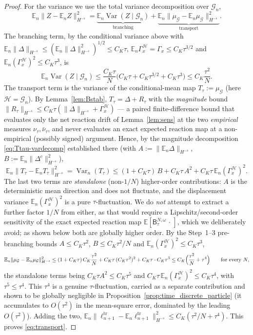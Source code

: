 \documentclass[a4paper,fleqn]{cas-sc}
\theoremstyle{definition}
\theoremstyle{remark}
\begin{document}
\begin{proof}
For the variance we use the total variance decomposition over $\mathcal G_n$,
\[
\mathbb E_n\|Z-\mathbb E_nZ\|_{H^{-s}}^2
=\underbrace{\mathbb E_n\operatorname{Var}(Z\mid\mathcal G_n)}_{\text{branching}}
+\underbrace{\mathbb E_n\|\mu_{\mathcal G}-\mathbb E_n\mu_{\mathcal G}\|_{H^{-s}}^2}_{\text{transport}}.
\]
The branching term, by the conditional variance above with
$\mathbb E_n\|\Delta\|_{H^{-s}}\le(\mathbb E_n\|\Delta\|_{H^{-s}}^2)^{1/2}\le C_K\tau$,
$\mathbb E_n\Gamma_x^{\mathcal H}=\Gamma_x\le C_K\tau^{3/2}$ and
$\mathbb E_n(\Gamma_x^{\mathcal H})^2\le C_K\tau^3$, is
\[
\mathbb E_n\operatorname{Var}(Z\mid\mathcal G_n)
\le\frac{C_K\tau}{N}\bigl(C_K\tau+C_K\tau^{3/2}+C_K\tau^3\bigr)\le C_K\frac{\tau^2}{N}.
\]
The transport term is the variance of the conditional-mean map
$T_\tau:=\mu_{\mathcal G}$ (here $\mathcal H=\mathcal G_n$). By Lemma~\ref{lem:Bstab},
$T_\tau=\Delta+R_\tau$ with the \emph{magnitude} bound
$\|R_\tau\|_{H^{-s}}\le C_K\tau(\|\Delta\|_{H^{-s}}+\Gamma_x^{\mathcal H})$ --- a paired
finite-difference bound that evaluates only the net reaction drift of
Lemma~\ref{lem:sens} at the two \emph{empirical} measures $\nu_\tau,\bar\nu_\tau$, and
never evaluates an exact expected reaction map at a non-empirical (possibly signed)
argument. Hence, by the magnitude decomposition \eqref{eq:Ttau-vardecomp} established
there (with $A:=\|\mathbb E_n\Delta\|_{H^{-s}}$, $B:=\mathbb E_n\|\Delta^c\|_{H^{-s}}^2$),
\begin{equation}\label{eq:Ttau-var}
\mathbb E_n\bigl\|T_\tau-\mathbb E_nT_\tau\bigr\|_{H^{-s}}^2
=\operatorname{Var}_n(T_\tau)
\le(1+C_K\tau)\,B+C_K\tau\,A^2+C_K\tau\,\mathbb E_n(\Gamma_x^{\mathcal H})^2 .
\end{equation}
The last two terms are \emph{standalone} (non-$1/N$) higher-order contributions: $A$
is the deterministic mean direction and does not fluctuate, and the displacement
variance $\mathbb E_n(\Gamma_x^{\mathcal H})^2$ is a pure $\tau$-fluctuation. We do
\emph{not} attempt to extract a further factor $1/N$ from either, as that would
require a Lipschitz/second-order sensitivity of the exact expected reaction map
$\mathbb E[\mathsf B^{N,\omega}_\tau\,\cdot\,]$, which we deliberately avoid; as shown
below both are globally higher order. By the Step~1--3 pre-branching bounds
$A\le C_K\tau^2$, $B\le C_K\tau^2/N$ and $\mathbb E_n(\Gamma_x^{\mathcal H})^2\le C_K\tau^3$,
\[
\mathbb E_n\|\mu_{\mathcal G}-\mathbb E_n\mu_{\mathcal G}\|_{H^{-s}}^2
\le(1+C_K\tau)\,C_K\frac{\tau^2}{N}+C_K\tau\,(C_K\tau^2)^2+C_K\tau\cdot C_K\tau^3
\le C_K\Bigl(\frac{\tau^2}{N}+\tau^4\Bigr)
\qquad\text{for every }N,
\]
the standalone terms being $C_K\tau A^2\le C_K\tau^5$ and
$C_K\tau\,\mathbb E_n(\Gamma_x^{\mathcal H})^2\le C_K\tau^4$, with $\tau^5\le\tau^4$.
This $\tau^4$ is a genuine $\tau$-fluctuation, carried as a separate contribution and
shown to be globally negligible in
Proposition~\ref{prop:time_discrete_particle} (it accumulates to $O(\tau^2)$ in the
mean-square error, dominated by the leading $O(\tau^2)$).
Adding the two, $\mathbb E_n\|\ell^{\mathrm{tr}}_{n+1}-\mathbb E_n\ell^{\mathrm{tr}}_{n+1}\|_{H^{-s}}^2
\le C_K(\tau^2/N+\tau^4)$. This proves \eqref{eq:transport}.
\end{proof}
\end{document}
